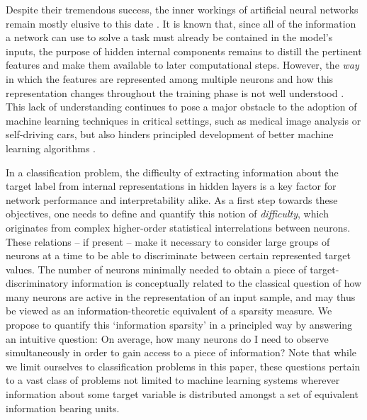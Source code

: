 \documentclass[10pt]{article}
\theoremstyle{definition}
\theoremstyle{plain}
\begin{document}
 Despite their tremendous success, the inner workings of artificial neural networks remain mostly elusive to this date \citep{lecun_deep_2015, alom_state---art_2019, samek_explainable_2017}. It is known that, since all of the information a network can use to solve a task must already be contained in the model's inputs, the purpose of hidden internal components remains to distill the pertinent features and make them available to later computational steps. However, the \emph{way} in which the features are represented among multiple neurons and how this representation changes throughout the training phase is not well understood \citep{li_convergent_2015, bengio_representation_2013}. This lack of understanding continues to pose a major obstacle to the adoption of machine learning techniques in critical settings, such as medical image analysis or self-driving cars, but also hinders principled development of better machine learning algorithms \citep{samek_explainable_2017, amodei_concrete_2016, eykholt_robust_2015}.

In a classification problem, the difficulty of extracting information about the target label from internal representations in hidden layers is a key factor for network performance and interpretability alike. As a first step towards these objectives, one needs to define and quantify this notion of \textit{difficulty}, which originates from complex higher-order statistical interrelations between neurons. These relations -- if present -- make it necessary to consider large groups of neurons at a time to be able to discriminate between certain represented target values. The number of neurons minimally needed to obtain a piece of target-discriminatory information is conceptually related to the classical question of how many neurons are active in the representation of an input sample, and may thus be viewed as an information-theoretic equivalent of a sparsity measure. We propose to quantify this `information sparsity' in a principled way by answering an intuitive question: On average, how many neurons do I need to observe simultaneously in order to gain access to a piece of information? Note that while we limit ourselves to classification problems in this paper, these questions pertain to a vast class of problems not limited to machine learning systems wherever information about some target variable is distributed amongst a set of equivalent information bearing units.
\end{document}

